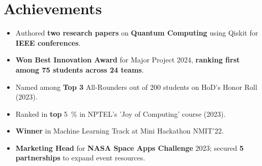 \documentclass[letterpaper,11pt]{article}
\newcommand{\resumeItem}[1]{
  \item\small{
    {#1 \vspace{-2pt}}
  }
}
\newcommand{\resumeSubHeadingListStart}{\begin{itemize}[leftmargin=0.0in, label={}]}
\newcommand{\resumeSubHeadingListEnd}{\end{itemize}}
\newcommand{\resumeItemListStart}{\begin{itemize}}
\newcommand{\resumeItemListEnd}{\end{itemize}\vspace{-5pt}}
\begin{document}
\section{Achievements}
    \resumeSubHeadingListStart
        \resumeItemListStart
            \resumeItem{Authored \textbf{two research papers} on \textbf{Quantum Computing} using Qiskit for \textbf{IEEE conferences}.}
            \resumeItem{\textbf{Won Best Innovation Award} for Major Project 2024, \textbf{ranking first among 75 students across 24 teams}.}
            \resumeItem{Named among \textbf{Top 3} All-Rounders out of 200 students on HoD's Honor Roll (2023).}
            \resumeItem{Ranked in \textbf{top} \SI{5}{\percent} in NPTEL's 'Joy of Computing' course (2023).}
            \resumeItem{\textbf{Winner} in Machine Learning Track at Mini Hackathon NMIT'22.}
            \resumeItem{\textbf{Marketing Head} for \textbf{NASA Space Apps Challenge} 2023; secured \textbf{5 partnerships} to expand event resources.}
        \resumeItemListEnd
    \resumeSubHeadingListEnd
\end{document}
